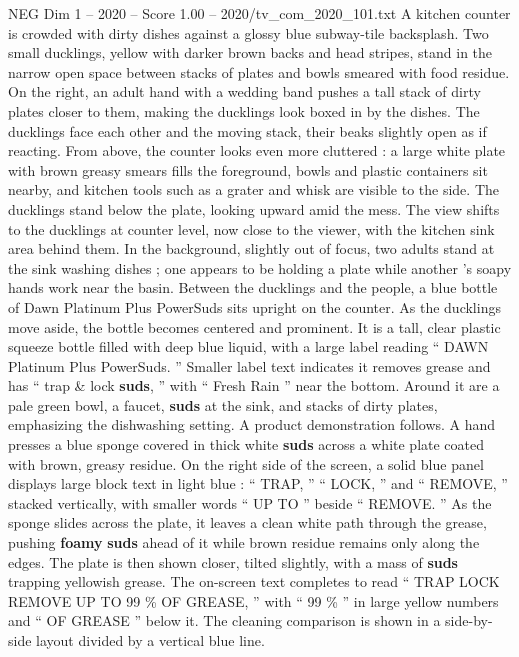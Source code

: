 \begin{textsample}{NEG Dim 1 – 2020 – Score 1.00 – 2020/tv\_com\_2020\_101.txt}  \label{ex:f1_neg_083}
A kitchen counter is crowded with dirty dishes against a glossy blue subway-tile backsplash.
Two small ducklings, yellow with darker brown backs and head stripes, stand in the narrow open space between stacks of plates and bowls smeared with food residue.
On the right, an adult hand with a wedding band pushes a tall stack of dirty plates closer to them, making the ducklings look boxed in by the dishes.
The ducklings face each other and the moving stack, their beaks slightly open as if reacting.
From above, the counter looks even more cluttered : a large white plate with brown greasy smears fills the foreground, bowls and plastic containers sit nearby, and kitchen tools such as a grater and whisk are visible to the side.
The ducklings stand below the plate, looking upward amid the mess.
The view shifts to the ducklings at counter level, now close to the viewer, with the kitchen sink area behind them.
In the background, slightly out of focus, two adults stand at the sink washing dishes ; one appears to be holding a plate while another ’s soapy hands work near the basin.
Between the ducklings and the people, a blue bottle of Dawn Platinum Plus PowerSuds sits upright on the counter.
As the ducklings move aside, the bottle becomes centered and prominent.
It is a tall, clear plastic squeeze bottle filled with deep blue liquid, with a large label reading “ DAWN Platinum Plus PowerSuds. ” Smaller label text indicates it removes grease and has “ trap \& lock \textbf{suds}, ” with “ Fresh Rain ” near the bottom.
Around it are a pale green bowl, a faucet, \textbf{suds} at the sink, and stacks of dirty plates, emphasizing the dishwashing setting.
A product demonstration follows.
A hand presses a blue sponge covered in thick white \textbf{suds} across a white plate coated with brown, greasy residue.
On the right side of the screen, a solid blue panel displays large block text in light blue : “ TRAP, ” “ LOCK, ” and “ REMOVE, ” stacked vertically, with smaller words “ UP TO ” beside “ REMOVE. ” As the sponge slides across the plate, it leaves a clean white path through the grease, pushing \textbf{foamy} \textbf{suds} ahead of it while brown residue remains only along the edges.
The plate is then shown closer, tilted slightly, with a mass of \textbf{suds} trapping yellowish grease.
The on-screen text completes to read “ TRAP LOCK REMOVE UP TO 99 \% OF GREASE, ” with “ 99 \% ” in large yellow numbers and “ OF GREASE ” below it.
The cleaning comparison is shown in a side-by-side layout divided by a vertical blue line.

\end{textsample}
